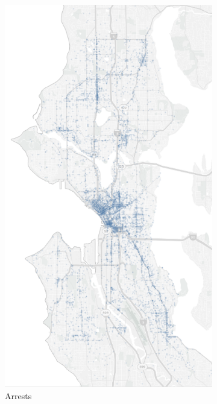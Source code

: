 \begin{figure}[h!] 
    \begin{subfigure}{0.5\textwidth}
        \centering
        \includegraphics[width=0.8\linewidth]{figures/1_2_geographical_distribution_arrests} 
        \caption{Arrests}
        \label{fig:1_2_arrests}
    \end{subfigure}
    \begin{subfigure}{0.5\textwidth}
        \centering

\end{subfigure}
\end{figure}
